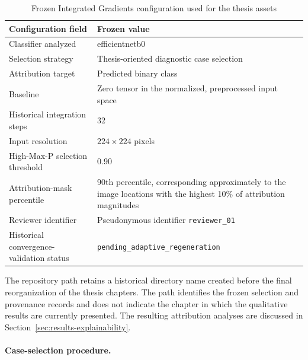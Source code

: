 \begin{table}[H]
\centering
\small
\renewcommand{\arraystretch}{1.15}
\setlength{\tabcolsep}{5pt}
\caption{Frozen Integrated Gradients configuration used for the thesis assets}
\label{tab:implementation-ig-configuration}
\begin{tabularx}{0.94\textwidth}{@{}l X@{}}
\toprule
\textbf{Configuration field} &
\textbf{Frozen value} \\
\midrule

Classifier analyzed
&
\gls{efficientnetb0} \\

Selection strategy
&
Thesis-oriented diagnostic case selection \\

Attribution target
&
Predicted binary class \\

Baseline
&
Zero tensor in the normalized, preprocessed input space \\

Historical integration steps
&
32 \\

Input resolution
&
\(224 \times 224\) pixels \\

High-Max-P selection threshold
&
0.90 \\

Attribution-mask percentile
&
90th percentile, corresponding approximately to the image locations with the
highest 10\% of attribution magnitudes \\

Reviewer identifier
&
Pseudonymous identifier \texttt{reviewer\_01} \\

Historical convergence-validation status
&
\texttt{pending\_adaptive\_regeneration} \\

\bottomrule
\end{tabularx}
\end{table}

The repository path
 retains a historical directory
name created before the final reorganization of the thesis chapters. The path
identifies the frozen selection and provenance records and does not indicate the
chapter in which the qualitative results are currently presented. The resulting
attribution analyses are discussed in
Section~\ref{sec:results-explainability}.

\paragraph{Case-selection procedure.}


